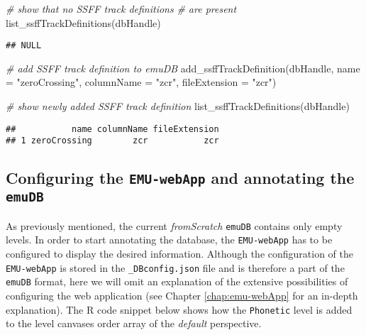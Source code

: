 \documentclass[
]{book}
\newenvironment{Shaded}{\begin{snugshade}}{\end{snugshade}}
\newcommand{\AttributeTok}[1]{\textcolor[rgb]{0.77,0.63,0.00}{#1}}
\newcommand{\CommentTok}[1]{\textcolor[rgb]{0.56,0.35,0.01}{\textit{#1}}}
\newcommand{\FunctionTok}[1]{\textcolor[rgb]{0.00,0.00,0.00}{#1}}
\newcommand{\NormalTok}[1]{#1}
\newcommand{\StringTok}[1]{\textcolor[rgb]{0.31,0.60,0.02}{#1}}
\begin{document}
\begin{Shaded}
\begin{Highlighting}[]
\CommentTok{\# show that no SSFF track definitions}
\CommentTok{\# are present}
\FunctionTok{list\_ssffTrackDefinitions}\NormalTok{(dbHandle)}
\end{Highlighting}
\end{Shaded}

\begin{verbatim}
## NULL
\end{verbatim}

\begin{Shaded}
\begin{Highlighting}[]
\CommentTok{\# add SSFF track definition to emuDB}
\FunctionTok{add\_ssffTrackDefinition}\NormalTok{(dbHandle,}
                        \AttributeTok{name =} \StringTok{"zeroCrossing"}\NormalTok{,}
                        \AttributeTok{columnName =} \StringTok{"zcr"}\NormalTok{,}
                        \AttributeTok{fileExtension =} \StringTok{"zcr"}\NormalTok{)}

\CommentTok{\# show newly added SSFF track definition}
\FunctionTok{list\_ssffTrackDefinitions}\NormalTok{(dbHandle)}
\end{Highlighting}
\end{Shaded}

\begin{verbatim}
##           name columnName fileExtension
## 1 zeroCrossing        zcr           zcr
\end{verbatim}

\hypertarget{configuring-the-emu-webapp-and-annotating-the-emudb}{%
\subsection{\texorpdfstring{Configuring the \texttt{EMU-webApp} and annotating the \texttt{emuDB}}{Configuring the EMU-webApp and annotating the emuDB}}\label{configuring-the-emu-webapp-and-annotating-the-emudb}}

As previously mentioned, the current \emph{fromScratch} \texttt{emuDB} contains only empty levels. In order to start annotating the database, the \texttt{EMU-webApp} has to be configured to display the desired information. Although the configuration of the \texttt{EMU-webApp} is stored in the \texttt{\_DBconfig.json} file and is therefore a part of the \texttt{emuDB} format, here we will omit an explanation of the extensive possibilities of configuring the web application (see Chapter \ref{chap:emu-webApp} for an in-depth explanation). The R code snippet below shows how the \texttt{Phonetic} level is added to the level canvases order array of the \emph{default} perspective.
\end{document}
